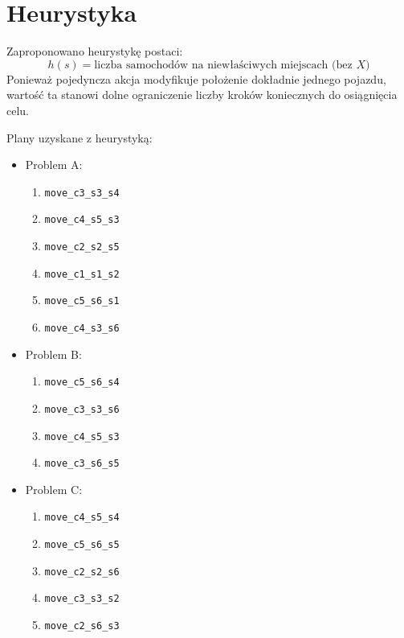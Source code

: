 \documentclass[12pt,a4paper]{article}
\begin{document}
\section{Heurystyka}
Zaproponowano heurystykę postaci:
\[
h(s)=\text{liczba samochodów na niewłaściwych miejscach (bez }X\text{)}
\]
Ponieważ pojedyncza akcja modyfikuje położenie dokładnie jednego pojazdu, wartość ta stanowi dolne ograniczenie liczby kroków koniecznych do osiągnięcia celu.

\begin{table}[h]
\centering
{}
\caption{Porównanie rozwiązań bez heurystyki i z heurystyką.}
\end{table}

Plany uzyskane z heurystyką:
\begin{itemize}
    \item Problem A:
    \begin{enumerate}
        \item \texttt{move\_c3\_s3\_s4}
        \item \texttt{move\_c4\_s5\_s3}
        \item \texttt{move\_c2\_s2\_s5}
        \item \texttt{move\_c1\_s1\_s2}
        \item \texttt{move\_c5\_s6\_s1}
        \item \texttt{move\_c4\_s3\_s6}
    \end{enumerate}
    \item Problem B:
    \begin{enumerate}
        \item \texttt{move\_c5\_s6\_s4}
        \item \texttt{move\_c3\_s3\_s6}
        \item \texttt{move\_c4\_s5\_s3}
        \item \texttt{move\_c3\_s6\_s5}
    \end{enumerate}
    \item Problem C:
    \begin{enumerate}
        \item \texttt{move\_c4\_s5\_s4}
        \item \texttt{move\_c5\_s6\_s5}
        \item \texttt{move\_c2\_s2\_s6}
        \item \texttt{move\_c3\_s3\_s2}
        \item \texttt{move\_c2\_s6\_s3}
    \end{enumerate}
\end{itemize}
\end{document}
